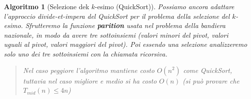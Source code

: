 \documentclass[oneside]{book}
\newtheorem{alg}{Algoritmo}
\begin{document}
\begin{alg}[Selezione dek $k$-esimo (QuickSort)]
  Possiamo ancora adattare l'approccio divide-et-impera del QuickSort per il
  problema della selezione del $k$-esimo. Sfrutteremo la funzione \textbf{parition}
  usata nel problema della bandiera nazionale, in modo da avere tre sottoinsiemi
  (valori minori del pivot, valori uguali al pivot, valori maggiori del pivot).
  Poi essendo una selezione analizzeremo solo uno dei tre sottoinsiemi con la
  chiamata ricorsiva.

  \begin{algorithm}[H]

  \end{algorithm}
  \begin{quote}
    Nel caso peggiore l'algoritmo mantiene costo $O(n^2)$ come QuickSort, tuttavia
    nel caso migliore e medio si ha costo $O(n)$ (si pu\`o provare che $T_{mid}(n) \leq 4n$)
  \end{quote}
\end{alg}

\pagebreak
\end{document}
